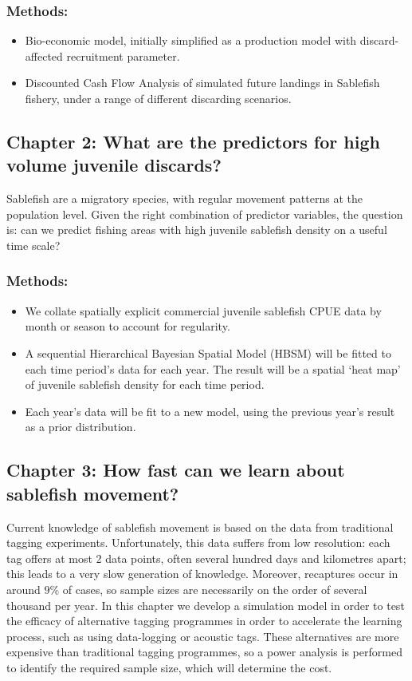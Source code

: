 \documentclass[11pt]{article}
\begin{document}
\subsubsection*{Methods:} 
\begin{itemize}
  \item Bio-economic model, initially simplified as a production model with discard-affected recruitment parameter.
  \item Discounted Cash Flow Analysis of simulated future landings in Sablefish fishery, under a range of different discarding scenarios.
\end{itemize}


\subsection*{Chapter 2: What are the predictors for high volume juvenile discards?}
Sablefish are a migratory species, with regular movement patterns at the population level. Given the right combination of predictor variables, the question is: can we predict fishing areas with high juvenile sablefish density on a useful time scale?

\subsubsection*{Methods:}
\begin{itemize}
  \item We collate spatially explicit commercial juvenile sablefish CPUE data by month or season to account for regularity.
  \item A sequential Hierarchical Bayesian Spatial Model (HBSM) \citep{lewison2009mapping,sims2008modeling} will be fitted to each time period's data for each year. The result will be a spatial `heat map' of juvenile sablefish density for each time period.
  \item Each year's data will be fit to a new model, using the previous year's result as a prior distribution.
\end{itemize}

\subsection*{Chapter 3: How fast can we learn about sablefish movement?}
Current knowledge of sablefish movement is based on the data from traditional tagging experiments. Unfortunately, this data suffers from low resolution: each tag offers at most 2 data points, often several hundred days and kilometres apart; this leads to a very slow generation of knowledge. Moreover, recaptures occur in around $9\%$ of cases, so sample sizes are necessarily on the order of several thousand per year. In this chapter we develop a simulation model in order to test the efficacy of alternative tagging programmes in order to accelerate the learning process, such as using data-logging or acoustic tags. These alternatives are more expensive than traditional tagging programmes, so a power analysis is performed to identify the required sample size, which will determine the cost.
\end{document}
